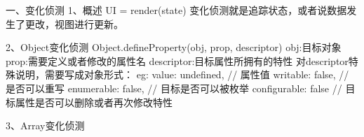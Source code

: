 一、变化侦测
1、概述
UI = render(state)
变化侦测就是追踪状态，或者说数据发生了更改，视图进行更新。

2、Object变化侦测
Object.defineProperty(obj, prop, descriptor)
    obj:目标对象
    prop:需要定义或者修改的属性名
    descriptor:目标属性所拥有的特性
    对descriptor特殊说明，需要写成对象形式：
    eg: {
        value: undefined, // 属性值
        writable: false, // 是否可以重写
        enumerable: false, // 目标是否可以被枚举
        configurable: false // 目标属性是否可以删除或者再次修改特性
    }

3、Array变化侦测

